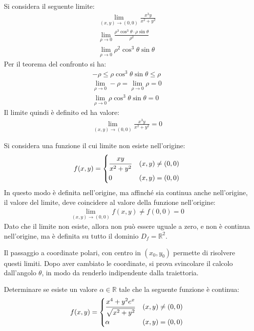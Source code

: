 \documentclass{article}
\numberwithin{equation}{subsection}
\begin{document}
Si considera il seguente limite:
\begin{gather*}
    \lim_{(x,y)\to(0,0)}\displaystyle\frac{x^3y}{x^2+y^2}\\
    \lim_{\rho\to0}\displaystyle\frac{\rho^3\cos^3\theta\cdot\rho\sin\theta}{\rho^2}\\
    \lim_{\rho\to0}\rho^2\cos^3\theta\sin\theta    
\end{gather*}
Per il teorema del confronto si ha:
\begin{gather*}
    -\rho\leq\rho\cos^3\theta\sin\theta\leq\rho\\
    \lim_{\rho\to0}-\rho=\lim_{\rho\to0}\rho=0\\
    \lim_{\rho\to0}\rho\cos^3\theta\sin\theta=0
\end{gather*}
Il limite quindi è definito ed ha valore:
\begin{gather*}
    \lim_{(x,y)\to(0,0)}\displaystyle\frac{x^3y}{x^2+y^2}=0
\end{gather*}


Si considera una funzione il cui limite non esiste nell'origine:
\begin{gather*}
    f(x,y)=\begin{cases}
        \displaystyle\frac{\strut xy}{\strut x^2+y^2}&(x,y)\neq(0,0)\\
        0&(x,y)=(0,0)
    \end{cases}
\end{gather*}
In questo modo è definita nell'origine, ma affinché sia continua anche nell'origine, il valore del limite, deve coincidere al valore della funzione nell'origine:
\begin{gather*}
    \lim_{(x,y)\to(0,0)}f(x,y)\neq f(0,0)=0
\end{gather*}
Dato che il limite non esiste, allora non può essere uguale a zero, e non è continua nell'origine, ma è definita su tutto il dominio $D_f=\mathbb{R}^2$. 

Il passaggio a coordinate polari, con centro in $(x_0,y_0)$ permette di risolvere questi limiti. Dopo aver cambiato le coordinate, si prova svincolare il calcolo dall'angolo $\theta$, in modo da renderlo indipendente dalla traiettoria. 



Determinare se esiste un valore $\alpha\in\mathbb{R}$ tale che la seguente funzione è continua:
\begin{gather*}
    f(x,y)=
    \begin{cases}
        \displaystyle\frac{\strut x^4+y^2e^x}{\strut\sqrt{x^2+y^2}}&(x,y)\neq(0,0)\\
        \alpha&(x,y)=(0,0)    
    \end{cases}
\end{gather*}
\end{document}
